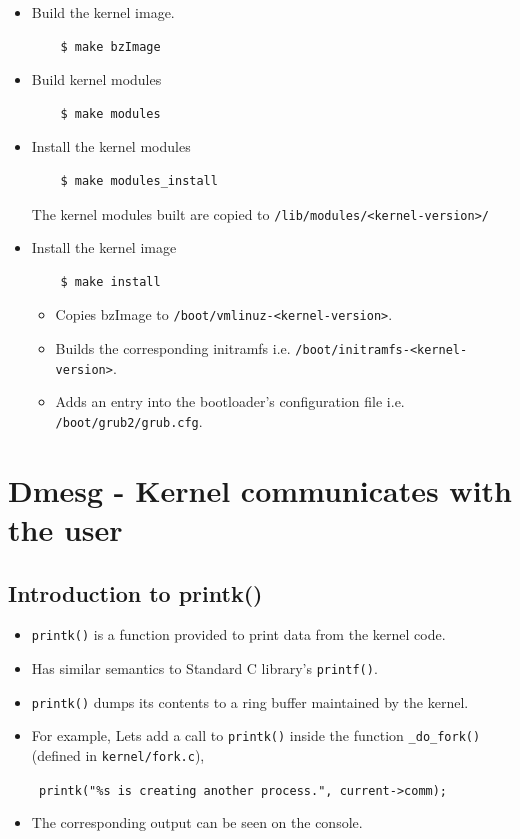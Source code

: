 \documentclass{beamer}
\begin{document}
\begin{frame}[fragile]
\begin{itemize}
\item Build the kernel image.
  \begin{lstlisting}
    $ make bzImage
  \end{lstlisting}

\item Build kernel modules
  \begin{lstlisting}
    $ make modules
  \end{lstlisting}
  
\item Install the kernel modules
  \begin{lstlisting}
    $ make modules_install
  \end{lstlisting}
  The kernel modules built are copied to {\tiny\texttt{/lib/modules/<kernel-version>/}}

\item Install the kernel image
  \begin{lstlisting}
    $ make install
  \end{lstlisting}
  \begin{itemize}
  \item Copies bzImage to {\tiny \texttt{/boot/vmlinuz-<kernel-version>}}.
  \item Builds the corresponding initramfs
    i.e. {\tiny \texttt{/boot/initramfs-<kernel-version>}}.
  \item Adds an entry into the bootloader's configuration file i.e. {\tiny \texttt{/boot/grub2/grub.cfg}}.
  \end{itemize}
\end{itemize}
\end{frame}

\section{Dmesg - Kernel communicates with the user}
\subsection{Introduction to printk()}
\begin{frame}
  \begin{itemize}
  \item \texttt{printk()} is a function provided to print data from the kernel
    code.
  \item Has similar semantics to Standard C library's \texttt{printf()}.

  \item \texttt{printk()} dumps its contents to a ring buffer maintained by
    the kernel.
  \item For example, Lets add a call to \texttt{printk()} inside the function
    \texttt{\_do\_fork()} (defined in \texttt{kernel/fork.c}),

  {\centering \texttt{ printk("\%s is creating another process.",
      current->comm);}} 
\item The corresponding output can be seen on the console.
  \end{itemize}
\end{frame}
\end{document}
